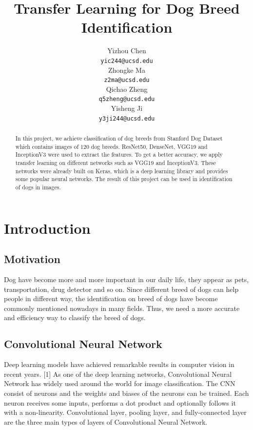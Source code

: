 \documentclass{article}
\title{Transfer Learning for Dog Breed Identification}
\author{%
  Yizhou Chen\\
  \texttt{yic244@ucsd.edu} \\
  \And
  Zhongke Ma\\
  \texttt{z2ma@ucsd.edu} \\
  \And
  Qichao Zheng\\
  \texttt{q5zheng@ucsd.edu} \\
  \And
  Yisheng Ji\\
  \texttt{y3ji244@ucsd.edu} \\
}
\begin{document}

\maketitle

\begin{abstract}
  In this project, we achieve classification of dog breeds from Stanford Dog Dataset which contains images of 120 dog breeds. ResNet50, DenseNet, VGG19 and InceptionV3 were used to extract the features. To get a better accuracy, we apply transfer learning on different networks such as VGG19 and InceptionV3. These networks were already built on Keras, which is a deep learning library and provides some popular neural networks. The result of this project can be used in identification of dogs in images.
\end{abstract}

\section{Introduction}

\subsection{Motivation}

Dog have become more and more important in our daily life, they appear as pets, transportation, drug detector and so on. Since different breed of dogs can help people in different way, the identification on breed of dogs have become commonly mentioned nowadays in many fields. Thus, we need a more accurate and efficiency way to classify the breed of dogs.


\subsection{Convolutional Neural Network}

Deep learning models have achieved remarkable results in computer vision in recent years. [1] As one of the deep learning networks, Convolutional Neural Network has widely used around the world for image classification. The CNN consist of neurons and the weights and biases of the neurons can be trained. Each neuron receives some inputs, performs a dot product and optionally follows it with a non-linearity. Convolutional layer, pooling layer, and fully-connected layer are the three main types of layers of Convolutional Neural Network.
\end{document}
